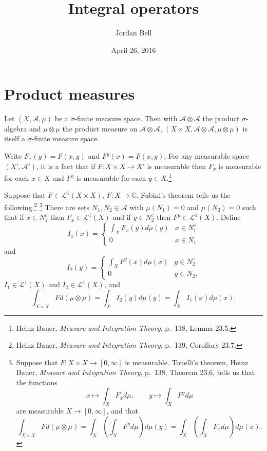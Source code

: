 \documentclass{article}
\theoremstyle{definition}
\begin{document}
\title{Integral operators}
\author{Jordan Bell}
\date{April 26, 2016}

\maketitle

\section{Product measures}
Let $(X,\mathscr{A},\mu)$ be a $\sigma$-finite measure space. Then with $\mathscr{A} \otimes \mathscr{A}$
the product $\sigma$-algebra and $\mu \otimes \mu$ the product measure on $\mathscr{A} \otimes \mathscr{A}$,
$(X \times X,\mathscr{A} \otimes \mathscr{A},\mu \otimes \mu)$ is itself a $\sigma$-finite measure space.

Write 
$F_x(y)=F(x,y)$ and $F^y(x)=F(x,y)$. 
For any measurable space $(X',\mathscr{A}')$, it is a fact that
if $F:X \times X \to X'$ is measurable then $F_x$ is measurable for each $x \in X$ and $F^y$ is measurable
for each $y \in X$.\footnote{Heinz Bauer, {\em Measure and Integration Theory},
p.~138, Lemma 23.5.}

Suppose that $F \in \mathscr{L}^1(X \times X)$, $F:X \to \mathbb{C}$.
Fubini's theorem
tells us the following.\footnote{Heinz Bauer, {\em Measure and Integration Theory},
p.~139, Corollary 23.7.}
\footnote{Suppose that $F:X \times X \to [0,\infty]$ is measurable.
Tonelli's theorem, Heinz Bauer, {\em Measure and Integration Theory},
p.~138, Theorem 23.6, tells us that the functions
\[
x \mapsto \int_X F_x d\mu,\qquad y \mapsto \int_X F^y d\mu
\]
are measurable $X \to [0,\infty]$, and that
\[
\int_{X \times X} F d(\mu \otimes \mu) = \int_X \left( \int_X F^y d\mu \right) d\mu(y)
=\int_X \left( \int_X F_x d\mu\right) d\mu(x).
\]}
There are sets $N_1,N_2 \in \mathscr{A}$ with $\mu(N_1)=0$ and $\mu(N_2)=0$ such that
if $x \in N_1^c$ then $F_x \in \mathscr{L}^1(X)$ and if $y \in N_2^c$ then
$F^y \in \mathscr{L}^1(X)$. 
Define
\[
I_1(x)=\begin{cases}
\int_X F_x(y) d\mu(y)&x \in N_1^c\\
0&x \in N_1
\end{cases}
\]
and
\[
I_2(y)=\begin{cases}
\int_X F^y(x) d\mu(x)&y \in N_2^c\\
0&y \in N_2.
\end{cases}
\]
$I_1 \in \mathscr{L}^1(X)$ and $I_2 \in \mathscr{L}^1(X)$,
and 
\[
\int_{X \times X} F d(\mu \otimes \mu) = \int_X I_2(y) d\mu(y)
=\int_X I_1(x) d\mu(x).
\]
\end{document}
